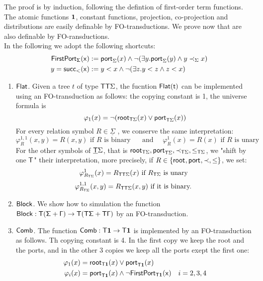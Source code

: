 \begin{pr}
The proof is by induction, following the defintion of first-order term functions. The atomic functions $\mathbf{1}$, constant functions, projection, co-projection and distributions are easily definable by FO-transductions.  
We prove now that are also definable by FO-ransductions. 
\\

In the following we adopt the following shortcuts:
\begin{align*}
\sf{FirstPort}_\Sigma (x)& := \mathsf{port}_{\Sigma}(x)\wedge \neg (\exists y. \mathsf{port}_{\Sigma}(y)\wedge y\prec_\Sigma x)\\
y=\sf{succ}_< (x) &:=  y<x \wedge \neg (\exists z. y<z \wedge z<x)
\end{align*} 
\begin{enumerate}
\item $\sf{Flat}$. Given a tree $t$ of type $\mathsf T\mathsf T\Sigma$, the fucntion $\sf{Flat}(t)$ can be implemented using an FO-transduction as follows: the copying constant is 1, the universe formula is 
\[\varphi_1(x) = \neg (\mathsf{root}_{\mathsf T\Sigma}(x) \vee \mathsf{port}_{\mathsf T\Sigma}(x) )  \]
For every relation symbol $R\in\underline \Sigma$ , we conserve the same interpretation:
\[\varphi_R^{1,1}(x,y)=R(x,y) \text{ if $R$ is binary }
\quad \text{ and } \quad\varphi_R^{1}(x)=R(x) \text{ if $R$ is unary }\] 
For the other symbols of $\underline{\mathsf T}\Sigma$, that is $\mathsf{root}_{\mathsf T\Sigma},\mathsf{port}_{\mathsf T\Sigma}, \prec_{\mathsf T\Sigma}, \leq_{\mathsf T\Sigma}$, we "shift by one $\mathsf T$" their interpretation, more precisely, if $R\in\{\mathsf{root}_{}, \mathsf{port}_{}, \prec, \leq\}$, we set:
\[ \varphi^1_{R_{\mathsf T\Sigma}}(x) = R_{\mathsf T\mathsf T\Sigma}(x) \text{ if $R_{\mathsf T\Sigma}$ is unary } \]
\[\varphi^{1,1}_{R_{\mathsf T\Sigma}}(x,y) = R_{\mathsf T\mathsf T\Sigma}(x,y) \text{ if it is binary. }\] 
\item $\sf{Block}$. We show how to simulation the function $\sf{Block}:\mathsf T (\Sigma + \Gamma) \to \mathsf T (\mathsf T \Sigma + \mathsf T \Gamma)$ by an FO-transduction. 
\item $\sf{Comb}$. The function $\sf{Comb}:\mathsf T \mathbf{1}\to\mathsf T\mathbf{1}$ is implemented by an FO-transduction as follows. Th copying constant is 4. 
In the first copy we keep the root and the ports, and in the other 3 copies we keep all the ports exept the first one:
\begin{align*}
\varphi_1(x)&=\mathsf{root}_{\mathsf T\mathbf{1}}(x) \vee \mathsf{port}_{\mathsf T\mathbf{1}}(x)\\
\varphi_i(x)&=\mathsf{port}_{\mathsf T\mathbf{1}}(x)\wedge \neg \sf{FirstPort}_{\mathsf T\mathbf{1}}(x)& i=2,3,4
\end{align*}


\end{enumerate}
\end{pr}
